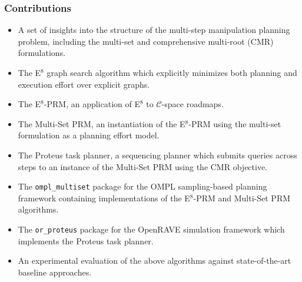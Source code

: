 \documentclass[serif]{beamer}
\begin{document}
\begin{frame}
   \frametitle{Contributions}
   
   \begin{itemize}
   \itemsep-3pt
   \item A set of insights into the structure of the
      multi-step manipulation planning problem,
      including the multi-set and comprehensive multi-root (CMR)
      formulations.
   \item The E$^8$ graph search algorithm which explicitly minimizes
      both planning and execution effort over explicit graphs.
   \item The E$^8$-PRM, an application of E$^8$ to
      $\mathcal{C}$-space roadmaps.
   \item The Multi-Set PRM, an instantiation of the E$^8$-PRM
      using the multi-set formulation as a planning effort model.
   \item The {\sc Proteus} task planner,
      a sequencing planner which submits queries across steps
      to an instance of the Multi-Set PRM using the CMR objective.
   \item The {\tt ompl\_multiset} package
      for the OMPL sampling-based planning framework
      containing implementations of the E$^8$-PRM and Multi-Set PRM
      algorithms.
   \item The {\tt or\_proteus} package for the
      OpenRAVE simulation framework
      which implements the {\sc Proteus} task planner.
   \item An experimental evaluation of the above algorithms against
      state-of-the-art baseline approaches.
   \end{itemize}
   
\end{frame}
\end{document}
